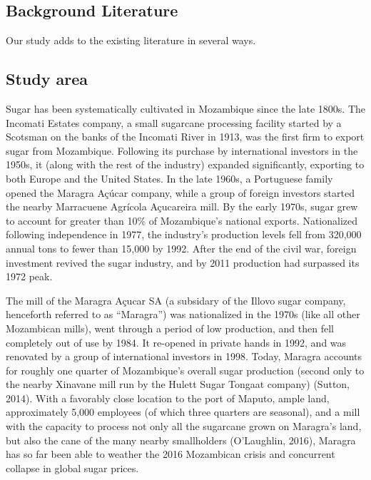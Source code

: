 \documentclass[]{article}
\begin{document}
\subsection{Background Literature}\label{background-literature}


Our study adds to the existing literature in several ways.

\subsection{Study area}\label{study-area}

Sugar has been systematically cultivated in Mozambique since the late
1800s. The Incomati Estates company, a small sugarcane processing
facility started by a Scotsman on the banks of the Incomati River in
1913, was the first firm to export sugar from Mozambique. Following its
purchase by international investors in the 1950s, it (along with the
rest of the industry) expanded significantly, exporting to both Europe
and the United States. In the late 1960s, a Portuguese family opened the
Maragra Açúcar company, while a group of foreign investors started the
nearby Marracuene Agrícola Açucareira mill. By the early 1970s, sugar
grew to account for greater than 10\% of Mozambique's national exports.
Nationalized following independence in 1977, the industry's production
levels fell from 320,000 annual tons to fewer than 15,000 by 1992. After
the end of the civil war, foreign investment revived the sugar industry,
and by 2011 production had surpassed its 1972 peak.

The mill of the Maragra Açucar SA (a subsidary of the Illovo sugar
company, henceforth referred to as ``Maragra'') was nationalized in the
1970s (like all other Mozambican mills), went through a period of low
production, and then fell completely out of use by 1984. It re-opened in
private hands in 1992, and was renovated by a group of international
investors in 1998. Today, Maragra accounts for roughly one quarter of
Mozambique's overall sugar production (second only to the nearby
Xinavane mill run by the Hulett Sugar Tongaat company) (Sutton, 2014).
With a favorably close location to the port of Maputo, ample land,
approximately 5,000 employees (of which three quarters are seasonal),
and a mill with the capacity to process not only all the sugarcane grown
on Maragra's land, but also the cane of the many nearby smallholders
(O'Laughlin, 2016), Maragra has so far been able to weather the 2016
Mozambican crisis and concurrent collapse in global sugar prices.
\end{document}
